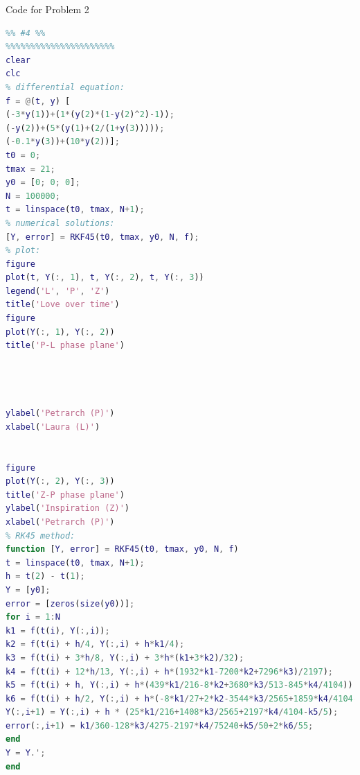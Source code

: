 \documentclass[11pt]{article}
\begin{document}
Code for Problem 2
\begin{lstlisting}[language=Matlab]
%% MA448 - Project: %%
%% #4 %%
%%%%%%%%%%%%%%%%%%%%%%
clear
clc
% differential equation:
f = @(t, y) [
(-3*y(1))+(1*(y(2)*(1-y(2)^2)-1));
(-y(2))+(5*(y(1)+(2/(1+y(3)))));
(-0.1*y(3))+(10*y(2))];
t0 = 0;
tmax = 21;
y0 = [0; 0; 0];
N = 100000;
t = linspace(t0, tmax, N+1);
% numerical solutions:
[Y, error] = RKF45(t0, tmax, y0, N, f);
% plot:
figure
plot(t, Y(:, 1), t, Y(:, 2), t, Y(:, 3))
legend('L', 'P', 'Z')
title('Love over time')
figure
plot(Y(:, 1), Y(:, 2))
title('P-L phase plane')




ylabel('Petrarch (P)')
xlabel('Laura (L)')


figure
plot(Y(:, 2), Y(:, 3))
title('Z-P phase plane')
ylabel('Inspiration (Z)')
xlabel('Petrarch (P)')
% RK45 method:
function [Y, error] = RKF45(t0, tmax, y0, N, f)
t = linspace(t0, tmax, N+1);
h = t(2) - t(1);
Y = [y0];
error = [zeros(size(y0))];
for i = 1:N
k1 = f(t(i), Y(:,i));
k2 = f(t(i) + h/4, Y(:,i) + h*k1/4);
k3 = f(t(i) + 3*h/8, Y(:,i) + 3*h*(k1+3*k2)/32);
k4 = f(t(i) + 12*h/13, Y(:,i) + h*(1932*k1-7200*k2+7296*k3)/2197);
k5 = f(t(i) + h, Y(:,i) + h*(439*k1/216-8*k2+3680*k3/513-845*k4/4104));
k6 = f(t(i) + h/2, Y(:,i) + h*(-8*k1/27+2*k2-3544*k3/2565+1859*k4/4104-11*k5/40));
Y(:,i+1) = Y(:,i) + h * (25*k1/216+1408*k3/2565+2197*k4/4104-k5/5);
error(:,i+1) = k1/360-128*k3/4275-2197*k4/75240+k5/50+2*k6/55;
end
Y = Y.';
end
\end{lstlisting} 
\end{document}
